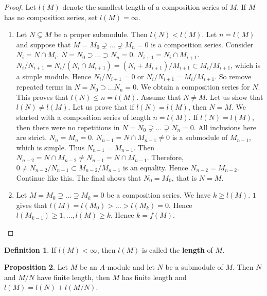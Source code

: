 \documentclass{article}
\newcommand{\rb}[1]{\left( #1 \right)}
\theoremstyle{definition}\newtheorem{definition}{Definition}[section]
\theoremstyle{definition}\newtheorem{remark}[definition]{Remark}
\theoremstyle{definition}\newtheorem*{example}{Example}
\theoremstyle{definition}\newtheorem*{note}{Note}
\newtheorem{proposition}[definition]{Proposition}
\begin{document}
\begin{proof}
Let $ l\rb{M} $ denote the smallest length of a composition series of $ M $. If $ M $ has no composition series, set $ l\rb{M} = \infty $.
\begin{enumerate}
\item Let $ N \subsetneq M $ be a proper submodule. Then $ l\rb{N} < l\rb{M} $. Let $ n = l\rb{M} $ and suppose that $ M = M_0 \supsetneq \dots \supsetneq M_n = 0 $ is a composition series. Consider $ N_i = N \cap M_i $. $ N = N_0 \supset \dots \supset N_n = 0 $. $ N_{i + 1} = N_i \cap M_{i + 1} $. $ N_i / N_{i + 1} = N_i / \rb{N_i \cap M_{i + 1}} = \rb{N_i + M_{i + 1}} / M_{i + 1} \subset M_i / M_{i + 1} $, which is a simple module. Hence $ N_i / N_{i + 1} = 0 $ or $ N_i / N_{i + 1} = M_i / M_{i + 1} $. So remove repeated terms in $ N = N_0 \supset \dots N_n = 0 $. We obtain a composition series for $ N $. This proves that $ l\rb{N} \le n = l\rb{M} $. Assume that $ N \ne M $. Let us show that $ l\rb{N} \ne l\rb{M} $. Let us prove that if $ l\rb{N} = l\rb{M} $, then $ N = M $. We started with a composition series of length $ n = l\rb{M} $. If $ l\rb{N} = l\rb{M} $, then there were no repetitions in $ N = N_0 \supsetneq \dots \supsetneq N_n = 0 $. All inclusions here are strict. $ N_n = M_n = 0 $. $ N_{n - 1} = N \cap M_{n - 1} \ne 0 $ is a submodule of $ M_{n - 1} $, which is simple. Thus $ N_{n - 1} = M_{n - 1} $. Then $ N_{n - 2} = N \cap M_{n - 2} \ne N_{n - 1} = N \cap M_{n - 1} $. Therefore, $ 0 \ne N_{n - 2} / N_{n - 1} \subset M_{n - 2} / M_{n - 1} $ is an equality. Hence $ N_{n - 2} = M_{n - 2} $. Continue like this. The final shows that $ N_0 = M_0 $, that is $ N = M $.
\item Let $ M = M_0 \supsetneq \dots \supsetneq M_k = 0 $ be a composition series. We have $ k \ge l\rb{M} $. $ 1 $ gives that $ l\rb{M} = l\rb{M_0} > \dots > l\rb{M_k} = 0 $. Hence $ l\rb{M_{k - 1}} \ge 1, \dots, l\rb{M} \ge k $. Hence $ k = f\rb{M} $.
\end{enumerate}
\end{proof}

\begin{definition}
If $ l\rb{M} < \infty $, then $ l\rb{M} $ is called the \textbf{length} of $ M $.
\end{definition}

\begin{proposition}
Let $ M $ be an $ A $-module and let $ N $ be a submodule of $ M $. Then $ N $ and $ M / N $ have finite length, then $ M $ has finite length and $ l\rb{M} = l\rb{N} + l\rb{M / N} $.
\end{proposition}
\end{document}
